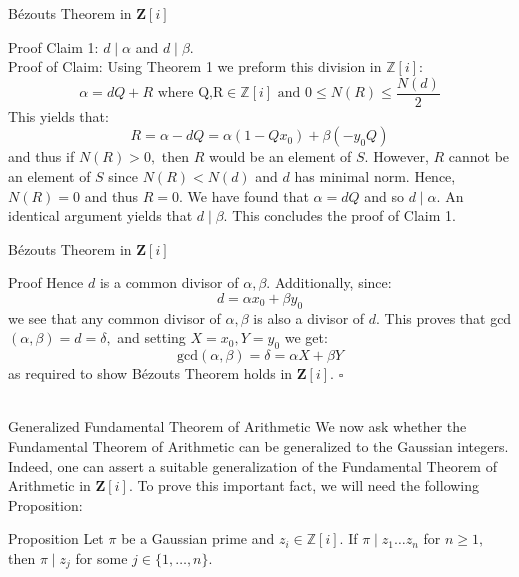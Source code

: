 \begin{frame}{Bézouts Theorem in $\mathbf{Z}[i]$}
    \begin{block}{Proof}
    Claim 1: $d\mid \alpha$ and $d\mid \beta.$\\
Proof of Claim: Using Theorem 1 we preform this division in $\mathbb{Z}[i]:$\\
$$\alpha=dQ+R \text{ where Q,R} \in\mathbb{Z}[i] \text{ and } 0\leq N(R)\leq\frac{N(d)}{2}$$
This yields that:
$$R=\alpha -dQ=\alpha(1-Qx_0)+\beta(-y_0 Q)$$
and thus if $N(R)>0,$ then $R$ would be an element of $S.$ However, $R$ cannot be an element of $S$ since $N(R)<N(d)$ and $d$ has minimal norm. Hence, $N(R)=0$ and thus $R=0.$ We have found that $\alpha =dQ$ and so $d\mid \alpha.$ An identical argument yields that $d\mid\beta.$ This concludes the proof of Claim 1.\\
    \end{block}
\end{frame}



\begin{frame}{Bézouts Theorem in $\mathbf{Z}[i]$}

    \begin{block}{Proof}
    Hence $d$ is a common divisor of $\alpha, \beta.$ Additionally, since:
$$d=\alpha x_0+\beta y_0$$
we see that any common divisor of $\alpha,\beta$ is also a divisor of $d.$ This proves that gcd$(\alpha,\beta)=d=\delta,$ and setting $X=x_0, Y=y_0$ we get:
$$\text{gcd}(\alpha, \beta)=\delta = \alpha X+\beta Y$$
as required to show Bézouts Theorem holds in $\mathbf{Z}[i]$. $\square$\\\\
    \end{block}
\end{frame}



\begin{frame}{Generalized Fundamental Theorem of Arithmetic}
    We  now  ask  whether  the  Fundamental  Theorem  of Arithmetic  can  be  generalized  to  the Gaussian integers. Indeed,  one  can  assert  a  suitable generalization  of  the  Fundamental Theorem  of Arithmetic  in $\mathbf{Z}[i]$. To prove this important fact, we will need the following Proposition:
    
    \begin{block}{Proposition}
    Let $\pi$ be a Gaussian prime and $z_i\in\mathbb{Z}[i].$ If $\pi\mid z_1 \ldots z_n$ for $n\geq 1,$ then $\pi\mid z_j$ for some $j\in\{1,\ldots,n\}$.
    \end{block}
\end{frame}

